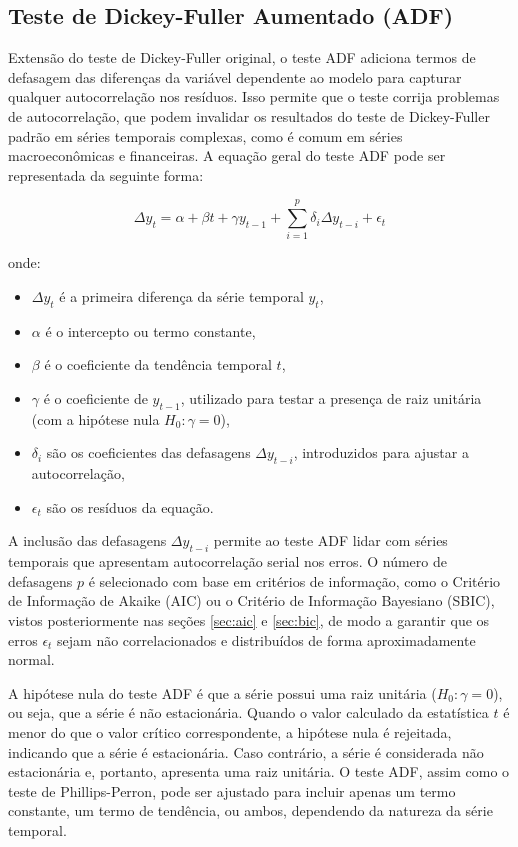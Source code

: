 \documentclass[12pt,oneside,a4paper,chapter=TITLE,english,brazil,sumario=abnt-6027-2012]{abntex2}
\begin{document}
\subsection{Teste de Dickey-Fuller Aumentado (ADF)}

Extensão do teste de Dickey-Fuller original, o teste ADF adiciona termos de defasagem das diferenças da variável dependente ao modelo para capturar qualquer autocorrelação nos resíduos. Isso permite que o teste corrija problemas de autocorrelação, que podem invalidar os resultados do teste de Dickey-Fuller padrão em séries temporais complexas, como é comum em séries macroeconômicas e financeiras.  A equação geral do teste ADF pode ser representada da seguinte forma:

\begin{equation}
	\Delta y_t = \alpha + \beta t + \gamma y_{t-1} + \sum_{i=1}^{p} \delta_i \Delta y_{t-i} + \epsilon_t
\end{equation}

onde:

\begin{itemize}
	\item \( \Delta y_t \) é a primeira diferença da série temporal \( y_t \),
	\item \( \alpha \) é o intercepto ou termo constante,
	\item \( \beta \) é o coeficiente da tendência temporal \( t \),
	\item \( \gamma \) é o coeficiente de \( y_{t-1} \), utilizado para testar a presença de raiz unitária (com a hipótese nula \( H_0: \gamma = 0 \)),
	\item \( \delta_i \) são os coeficientes das defasagens \( \Delta y_{t-i} \), introduzidos para ajustar a autocorrelação,
	\item \( \epsilon_t \) são os resíduos da equação.
\end{itemize}

A inclusão das defasagens \( \Delta y_{t-i} \) permite ao teste ADF lidar com séries temporais que apresentam autocorrelação serial nos erros. O número de defasagens \( p \) é selecionado com base em critérios de informação, como o Critério de Informação de Akaike (AIC) ou o Critério de Informação Bayesiano (SBIC), vistos posteriormente nas seções \ref{sec:aic} e \ref{sec:bic}, de modo a garantir que os erros \( \epsilon_t \) sejam não correlacionados e distribuídos de forma aproximadamente normal.

A hipótese nula do teste ADF é que a série possui uma raiz unitária (\( H_0: \gamma = 0 \)), ou seja, que a série é não estacionária. Quando o valor calculado da estatística \( t \) é menor do que o valor crítico correspondente, a hipótese nula é rejeitada, indicando que a série é estacionária. Caso contrário, a série é considerada não estacionária e, portanto, apresenta uma raiz unitária. O teste ADF, assim como o teste de Phillips-Perron, pode ser ajustado para incluir apenas um termo constante, um termo de tendência, ou ambos, dependendo da natureza da série temporal.
\end{document}
